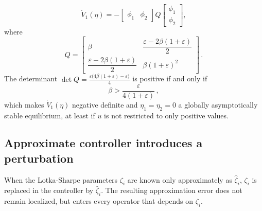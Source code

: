 \documentclass[journal,twoside,web]{ieeecolor}
\begin{document}
\begin{equation}
\dot V_1(\eta)
=
-\begin{bmatrix}\phi_1 & \phi_2\end{bmatrix}
Q
\begin{bmatrix}\phi_1\\ \phi_2\end{bmatrix},
\end{equation}
where
\begin{equation}
Q=
\begin{bmatrix}
\beta & \dfrac{\varepsilon-2\beta(1+\varepsilon)}{2}\\[1.2ex]
\dfrac{\varepsilon-2\beta(1+\varepsilon)}{2} & \beta(1+\varepsilon)^2
\end{bmatrix}\,.
\end{equation}
The determinant 
$\det Q =\frac{\varepsilon\bigl(4\beta(1+\varepsilon)-\varepsilon\bigr)}{4}$ is positive if and only if 
\begin{equation}
\beta>\frac{\varepsilon}{4(1+\varepsilon)}\,,
\end{equation}
which makes $\dot V_1(\eta)$ negative definite and $\eta_1=\eta_2=0$ a globally asymptotically stable equilibrium, at least if $u$ is not restricted to only positive values. 

\subsection{Approximate controller introduces a perturbation}

When the Lotka-Sharpe parameters $\zeta_i$ are known only approximately as $\hat\zeta_i$, $\zeta_i$ is replaced in the controller by $\hat\zeta_i$. The resulting approximation error does not remain localized, but enters every operator that depends on $\zeta_i$. 
\end{document}
